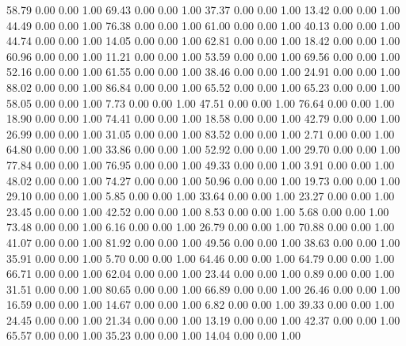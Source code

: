    58.79   0.00   0.00   1.00
   69.43   0.00   0.00   1.00
   37.37   0.00   0.00   1.00
   13.42   0.00   0.00   1.00
   44.49   0.00   0.00   1.00
   76.38   0.00   0.00   1.00
   61.00   0.00   0.00   1.00
   40.13   0.00   0.00   1.00
   44.74   0.00   0.00   1.00
   14.05   0.00   0.00   1.00
   62.81   0.00   0.00   1.00
   18.42   0.00   0.00   1.00
   60.96   0.00   0.00   1.00
   11.21   0.00   0.00   1.00
   53.59   0.00   0.00   1.00
   69.56   0.00   0.00   1.00
   52.16   0.00   0.00   1.00
   61.55   0.00   0.00   1.00
   38.46   0.00   0.00   1.00
   24.91   0.00   0.00   1.00
   88.02   0.00   0.00   1.00
   86.84   0.00   0.00   1.00
   65.52   0.00   0.00   1.00
   65.23   0.00   0.00   1.00
   58.05   0.00   0.00   1.00
    7.73   0.00   0.00   1.00
   47.51   0.00   0.00   1.00
   76.64   0.00   0.00   1.00
   18.90   0.00   0.00   1.00
   74.41   0.00   0.00   1.00
   18.58   0.00   0.00   1.00
   42.79   0.00   0.00   1.00
   26.99   0.00   0.00   1.00
   31.05   0.00   0.00   1.00
   83.52   0.00   0.00   1.00
    2.71   0.00   0.00   1.00
   64.80   0.00   0.00   1.00
   33.86   0.00   0.00   1.00
   52.92   0.00   0.00   1.00
   29.70   0.00   0.00   1.00
   77.84   0.00   0.00   1.00
   76.95   0.00   0.00   1.00
   49.33   0.00   0.00   1.00
    3.91   0.00   0.00   1.00
   48.02   0.00   0.00   1.00
   74.27   0.00   0.00   1.00
   50.96   0.00   0.00   1.00
   19.73   0.00   0.00   1.00
   29.10   0.00   0.00   1.00
    5.85   0.00   0.00   1.00
   33.64   0.00   0.00   1.00
   23.27   0.00   0.00   1.00
   23.45   0.00   0.00   1.00
   42.52   0.00   0.00   1.00
    8.53   0.00   0.00   1.00
    5.68   0.00   0.00   1.00
   73.48   0.00   0.00   1.00
    6.16   0.00   0.00   1.00
   26.79   0.00   0.00   1.00
   70.88   0.00   0.00   1.00
   41.07   0.00   0.00   1.00
   81.92   0.00   0.00   1.00
   49.56   0.00   0.00   1.00
   38.63   0.00   0.00   1.00
   35.91   0.00   0.00   1.00
    5.70   0.00   0.00   1.00
   64.46   0.00   0.00   1.00
   64.79   0.00   0.00   1.00
   66.71   0.00   0.00   1.00
   62.04   0.00   0.00   1.00
   23.44   0.00   0.00   1.00
    0.89   0.00   0.00   1.00
   31.51   0.00   0.00   1.00
   80.65   0.00   0.00   1.00
   66.89   0.00   0.00   1.00
   26.46   0.00   0.00   1.00
   16.59   0.00   0.00   1.00
   14.67   0.00   0.00   1.00
    6.82   0.00   0.00   1.00
   39.33   0.00   0.00   1.00
   24.45   0.00   0.00   1.00
   21.34   0.00   0.00   1.00
   13.19   0.00   0.00   1.00
   42.37   0.00   0.00   1.00
   65.57   0.00   0.00   1.00
   35.23   0.00   0.00   1.00
   14.04   0.00   0.00   1.00
